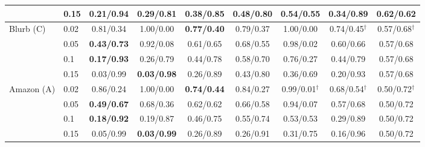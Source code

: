 \begin{tabular}{llccccccc}
 & 0.15 & \textbf{0.21/0.94} & 0.29/0.81 & 0.38/0.85 & 0.48/0.80 & 0.54/0.55 & 0.34/0.89 & 0.62/0.62 \\
\midrule
Blurb (C) & 0.02 & 0.81/0.34 & 1.00/0.00 & \textbf{0.77/0.40} & 0.79/0.37 & 1.00/0.00 & 0.74/0.45$^\dagger$ & 0.57/0.68$^\dagger$ \\
 & 0.05 & \textbf{0.43/0.73} & 0.92/0.08 & 0.61/0.65 & 0.68/0.55 & 0.98/0.02 & 0.60/0.66 & 0.57/0.68 \\
 & 0.1 & \textbf{0.17/0.93} & 0.26/0.79 & 0.44/0.78 & 0.58/0.70 & 0.76/0.27 & 0.44/0.79 & 0.57/0.68 \\
 & 0.15 & 0.03/0.99 & \textbf{0.03/0.98} & 0.26/0.89 & 0.43/0.80 & 0.36/0.69 & 0.20/0.93 & 0.57/0.68 \\
\midrule
Amazon (A) & 0.02 & 0.86/0.24 & 1.00/0.00 & \textbf{0.74/0.44} & 0.84/0.27 & 0.99/0.01$^\dagger$ & 0.68/0.54$^\dagger$ & 0.50/0.72$^\dagger$ \\
 & 0.05 & \textbf{0.49/0.67} & 0.68/0.36 & 0.62/0.62 & 0.66/0.58 & 0.94/0.07 & 0.57/0.68 & 0.50/0.72 \\
 & 0.1 & \textbf{0.18/0.92} & 0.19/0.87 & 0.46/0.75 & 0.55/0.74 & 0.53/0.53 & 0.29/0.89 & 0.50/0.72 \\
 & 0.15 & 0.05/0.99 & \textbf{0.03/0.99} & 0.26/0.89 & 0.26/0.91 & 0.31/0.75 & 0.16/0.96 & 0.50/0.72 \\
\bottomrule
\end{tabular}
